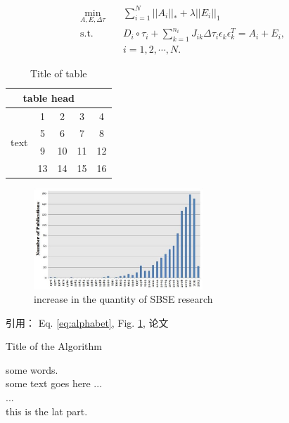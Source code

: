 \documentclass[UTF8,a4paper,10pt,twocolumn]{ctexart}
\begin{document}
    \begin{equation}
	\begin{aligned} \label{eq:rasl}
	\min_{A,E,\Delta \tau} \quad & \sum_{i=1}^{N}||A_i||_* + \lambda ||E_i||_1  \\
	\mathrm{s.t.} \quad & D_i \circ \tau_i + \sum_{k=1}^{n_i} J_{ik} \Delta \tau_i \epsilon_k \epsilon_k^T = A_i + E_i, \\
	& i = 1,2,\cdots,N. 
	\end{aligned}
	\end{equation}
 
    \begin{table}[htbp]
		\caption{Title of table} \label{tab:table}
		\centering
		\addtolength{\tabcolsep}{-0mm} %
		\begin{tabular}{ccccc}
			\toprule[0.75pt]	%
			\multicolumn{4}{c}{table head} \\
			\midrule[0.5pt]	%
			\multirow{4}{*}{text} & 1 & 2 & 3 & 4 \\  %
			& 5 & 6 & 7 & 8 \\
			\cmidrule[0.5pt]{2-4}	%
			& 9 & 10 & 11 & 12 \\
			& 13 & 14 & 15 & 16 \\
			\bottomrule[0.75pt]	%
		\end{tabular}
	\end{table}

	\begin{figure}[htbp]
		\centering
		\includegraphics[width=2.5in]{increaseInTheQuantityOfSBSEResearch.jpg}
		\caption{increase in the quantity of SBSE research} 
		\label{fig:increaseInSBSE}
	\end{figure}

    引用： Eq. \eqref{eq:alphabet}, Fig. \ref{fig:increaseInSBSE},  论文\cite{doi:10.1002/stvr.294}
    
 
    \begin{algorithm}
		\caption{Title of the Algorithm}
		\label{algo:ref}
		\begin{algorithmic}[1]
			\REQUIRE some words.  %
			\ENSURE ~\\           %
			some text goes here ... \\
			\STATE ... \\  %
			\ENDWHILE
			\RETURN this is the lat part.  %
		\end{algorithmic}
    \end{algorithm}
 
 


\end{document}
